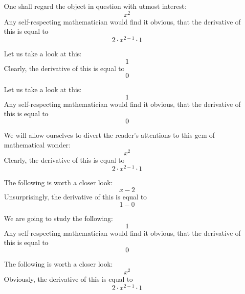\documentclass{article}
\begin{document}
One shall regard the object in question with utmost interest:
\begin{equation}
x ^{2 } 
\end{equation}
Any self-respecting mathematician would find it obvious, that the derivative of this is equal to
\begin{equation}
2 \cdot x ^{2 - 1 } \cdot 1 
\end{equation}

Let us take a look at this:
\begin{equation}
1 
\end{equation}
Clearly, the derivative of this is equal to
\begin{equation}
0 
\end{equation}

Let us take a look at this:
\begin{equation}
1 
\end{equation}
Any self-respecting mathematician would find it obvious, that the derivative of this is equal to
\begin{equation}
0 
\end{equation}

We will allow ourselves to divert the reader's attentions to this gem of mathematical wonder:
\begin{equation}
x ^{2 } 
\end{equation}
Clearly, the derivative of this is equal to
\begin{equation}
2 \cdot x ^{2 - 1 } \cdot 1 
\end{equation}

The following is worth a closer look:
\begin{equation}
x - 2 
\end{equation}
Unsurprisingly, the derivative of this is equal to
\begin{equation}
1 - 0 
\end{equation}

We are going to study the following:
\begin{equation}
1 
\end{equation}
Any self-respecting mathematician would find it obvious, that the derivative of this is equal to
\begin{equation}
0 
\end{equation}

The following is worth a closer look:
\begin{equation}
x ^{2 } 
\end{equation}
Obviously, the derivative of this is equal to
\begin{equation}
2 \cdot x ^{2 - 1 } \cdot 1 
\end{equation}
\end{document}
